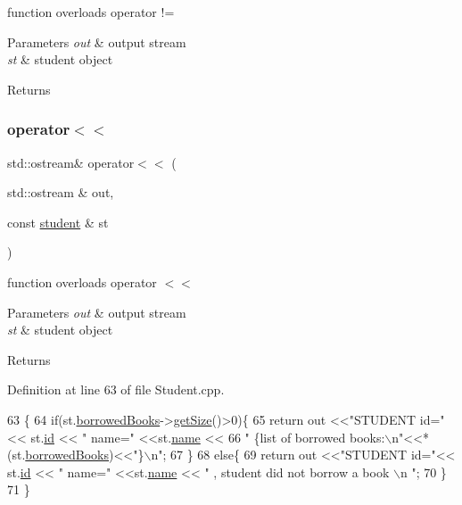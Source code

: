 function overloads operator != 
\begin{DoxyParams}{Parameters}
{\em out} & output stream \\
\hline
{\em st} & student object \\
\hline
\end{DoxyParams}
\begin{DoxyReturn}{Returns}

\end{DoxyReturn}
\mbox{\label{classstudent_a73f5ef786ecabf4118c6606f42829606}} 
\subsubsection{\texorpdfstring{operator$<$$<$}{operator<<}}
{\footnotesize\ttfamily std\+::ostream\& operator$<$$<$ (\begin{DoxyParamCaption}\item[{std\+::ostream \&}]{out,  }\item[{const \hyperlink{classstudent}{student} \&}]{st }\end{DoxyParamCaption})\hspace{0.3cm}{\ttfamily [friend]}}

function overloads operator $<$$<$ 
\begin{DoxyParams}{Parameters}
{\em out} & output stream \\
\hline
{\em st} & student object \\
\hline
\end{DoxyParams}
\begin{DoxyReturn}{Returns}

\end{DoxyReturn}


Definition at line 63 of file Student.\+cpp.


\begin{DoxyCode}
63                                                            \{
64     \textcolor{keywordflow}{if}(st.\hyperlink{classstudent_ab477f6c1525709586ea41364dc8c568b}{borrowedBooks}->\hyperlink{classqueue_l_l_a8969feebcb563f0b489bc112422b9563}{getSize}()>0)\{
65         \textcolor{keywordflow}{return} out <<\textcolor{stringliteral}{"STUDENT id="}<< st.\hyperlink{classstudent_a8215d11b0d1adc77e0808a0ff4d0f6a2}{id} << \textcolor{stringliteral}{" name="} <<st.\hyperlink{classstudent_a8bba46a454eaecf8619a68c4c38c7b8d}{name} <<
66                 \textcolor{stringliteral}{" \{list of borrowed books:\(\backslash\)n"}<<*(st.\hyperlink{classstudent_ab477f6c1525709586ea41364dc8c568b}{borrowedBooks})<<\textcolor{stringliteral}{"\}\(\backslash\)n"};
67     \}
68     \textcolor{keywordflow}{else}\{
69         \textcolor{keywordflow}{return} out <<\textcolor{stringliteral}{"STUDENT id="}<< st.\hyperlink{classstudent_a8215d11b0d1adc77e0808a0ff4d0f6a2}{id} << \textcolor{stringliteral}{" name="} <<st.\hyperlink{classstudent_a8bba46a454eaecf8619a68c4c38c7b8d}{name} << \textcolor{stringliteral}{" , student did not borrow a book
      \(\backslash\)n "};
70     \}
71 \}
\end{DoxyCode}



